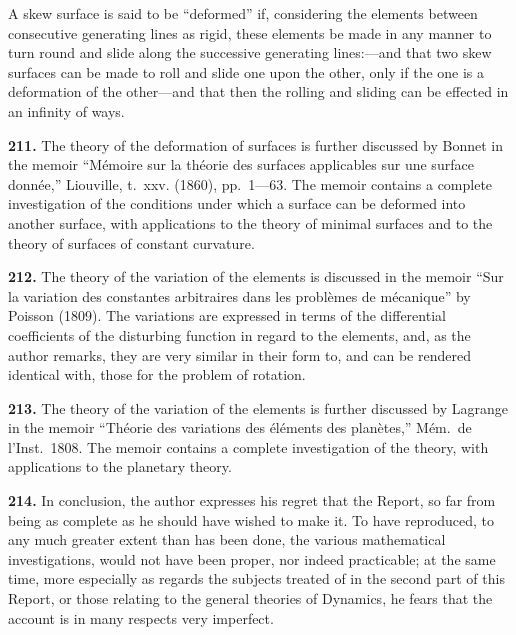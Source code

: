 \documentclass[12pt,a4paper]{article}
\theoremstyle{definition}
\begin{document}
A skew surface is said to be ``deformed'' if, considering the elements between consecutive generating lines as rigid, these elements be made in any manner to turn round and slide along the successive generating lines:---and that two skew surfaces can be made to roll and slide one upon the other, only if the one is a deformation of the other---and that then the rolling and sliding can be effected in an infinity of ways.

\vspace{1em}

\noindent\textbf{211.} The theory of the deformation of surfaces is further discussed by Bonnet in the memoir ``M\'{e}moire sur la th\'{e}orie des surfaces applicables sur une surface donn\'{e}e,'' Liouville, t.~xxv. (1860), pp.~1---63. The memoir contains a complete investigation of the conditions under which a surface can be deformed into another surface, with applications to the theory of minimal surfaces and to the theory of surfaces of constant curvature.

\vspace{1em}

\noindent\textbf{212.} The theory of the variation of the elements is discussed in the memoir ``Sur la variation des constantes arbitraires dans les probl\`{e}mes de m\'{e}canique'' by Poisson (1809). The variations are expressed in terms of the differential coefficients of the disturbing function in regard to the elements, and, as the author remarks, they are very similar in their form to, and can be rendered identical with, those for the problem of rotation.

\vspace{1em}

\noindent\textbf{213.} The theory of the variation of the elements is further discussed by Lagrange in the memoir ``Th\'{e}orie des variations des \'{e}l\'{e}ments des plan\`{e}tes,'' M\'{e}m.~de l'Inst.~1808. The memoir contains a complete investigation of the theory, with applications to the planetary theory.

\vspace{1em}

\noindent\textbf{214.} In conclusion, the author expresses his regret that the Report, so far from being as complete as he should have wished to make it. To have reproduced, to any much greater extent than has been done, the various mathematical investigations, would not have been proper, nor indeed practicable; at the same time, more especially as regards the subjects treated of in the second part of this Report, or those relating to the general theories of Dynamics, he fears that the account is in many respects very imperfect.
\end{document}
